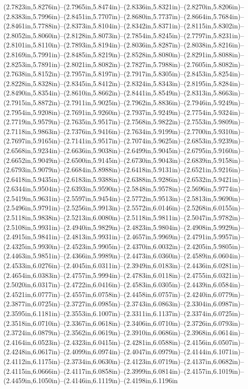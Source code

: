 (2.7823in,5.8276in)--(2.7965in,5.8474in)--(2.8336in,5.8321in)--(2.8270in,5.8206in)--(2.8383in,5.7996in)--(2.8451in,5.7707in)--(2.8680in,5.7737in)--(2.8664in,5.7684in)--(2.8461in,5.7788in)--(2.8373in,5.8104in)--(2.8342in,5.8371in)--(2.8115in,5.8302in)--(2.8052in,5.8060in)--(2.8128in,5.8073in)--(2.7854in,5.8245in)--(2.7797in,5.8231in)--(2.8101in,5.8110in)--(2.7893in,5.8194in)--(2.8036in,5.8287in)--(2.8038in,5.8216in)--(2.8169in,5.7991in)--(2.8485in,5.8219in)--(2.8528in,5.8080in)--(2.8291in,5.8088in)--(2.8253in,5.7891in)--(2.8021in,5.8082in)--(2.7827in,5.7988in)--(2.7605in,5.8082in)--(2.7638in,5.8152in)--(2.7957in,5.8197in)--(2.7917in,5.8305in)--(2.8453in,5.8254in)--(2.8228in,5.8328in)--(2.8345in,5.8412in)--(2.8324in,5.8343in)--(2.8195in,5.8284in)--(2.8490in,5.8354in)--(2.8610in,5.8662in)--(2.8441in,5.8549in)--(2.8313in,5.8663in)--(2.7915in,5.8872in)--(2.7911in,5.9025in)--(2.7962in,5.8836in)--(2.7946in,5.9249in)--(2.7954in,5.9208in)--(2.7691in,5.9260in)--(2.7937in,5.9249in)--(2.7754in,5.9324in)--(2.7719in,5.9579in)--(2.7635in,5.9517in)--(2.7568in,5.9822in)--(2.7553in,5.9809in)--(2.7118in,5.9863in)--(2.7376in,5.9416in)--(2.7634in,5.9199in)--(2.7700in,5.9310in)--(2.7697in,5.9165in)--(2.7141in,5.9517in)--(2.7074in,5.9625in)--(2.6853in,5.9239in)--(2.6568in,5.9234in)--(2.6636in,5.9038in)--(2.6499in,5.9045in)--(2.6795in,5.9160in)--(2.6652in,5.9049in)--(2.6500in,5.9145in)--(2.6730in,5.9043in)--(2.6839in,5.9158in)--(2.6793in,5.9079in)--(2.6684in,5.8988in)--(2.6418in,5.9131in)--(2.6521in,5.9216in)--(2.6418in,5.9435in)--(2.6183in,5.9388in)--(2.6388in,5.9286in)--(2.6532in,5.9421in)--(2.6344in,5.9504in)--(2.6393in,5.9590in)--(2.5848in,5.9578in)--(2.5696in,5.9774in)--(2.5419in,5.9631in)--(2.5597in,5.9454in)--(2.5772in,5.9513in)--(2.5813in,5.9690in)--(2.5496in,5.9791in)--(2.5256in,5.9913in)--(2.5572in,6.0146in)--(2.5268in,6.0155in)--(2.5118in,5.9838in)--(2.5213in,6.0080in)--(2.5118in,5.9811in)--(2.5047in,5.9782in)--(2.5108in,5.9931in)--(2.4940in,5.9829in)--(2.4823in,5.9804in)--(2.4908in,5.9929in)--(2.4915in,5.9841in)--(2.4813in,5.9931in)--(2.4657in,5.9969in)--(2.4791in,5.9957in)--(2.4325in,5.9930in)--(2.4523in,5.9905in)--(2.4370in,6.0032in)--(2.4205in,5.9805in)--(2.4463in,5.9851in)--(2.4366in,5.9989in)--(2.4473in,6.0360in)--(2.4589in,6.0604in)--(2.4533in,6.0276in)--(2.4045in,6.0311in)--(2.3949in,6.0183in)--(2.4436in,6.0281in)--(2.4654in,6.0383in)--(2.4757in,5.9994in)--(2.4783in,6.0118in)--(2.4755in,6.0321in)--(2.5020in,6.0317in)--(2.4722in,6.0416in)--(2.4583in,6.0305in)--(2.4439in,6.0584in)--(2.4521in,6.0777in)--(2.4557in,6.0758in)--(2.4458in,6.0757in)--(2.4240in,6.0779in)--(2.3877in,6.0725in)--(2.3727in,6.0985in)--(2.3743in,6.0863in)--(2.3304in,6.0987in)--(2.3595in,6.1181in)--(2.3553in,6.1007in)--(2.3311in,6.1137in)--(2.3374in,6.0725in)--(2.3518in,6.0710in)--(2.3367in,6.0618in)--(2.3406in,6.0710in)--(2.3726in,6.0793in)--(2.3724in,6.0879in)--(2.3562in,6.0619in)--(2.3910in,6.0686in)--(2.3968in,6.0614in)--(2.4164in,6.0523in)--(2.4323in,6.0415in)--(2.4281in,6.0588in)--(2.4156in,6.0507in)--(2.4248in,6.0617in)--(2.4099in,6.0974in)--(2.4047in,6.0979in)--(2.4144in,6.1071in)--(2.4112in,6.1175in)--(2.3734in,6.0630in)--(2.4123in,6.0719in)--(2.4137in,6.0682in)--(2.4115in,6.0666in)--(2.4117in,6.0858in)--(2.3999in,6.0814in)--(2.4157in,6.1019in)--(2.4459in,6.1050in)--(2.4146in,6.1119in)--(2.4198in,6.1196in